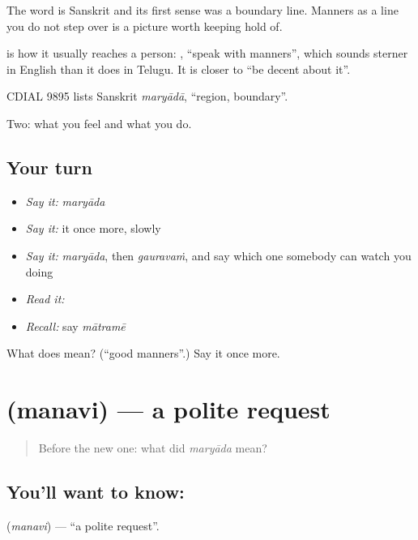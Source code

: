 The word is Sanskrit and its first sense was a boundary line. Manners as a line you do not step over is a picture worth keeping hold of.

 is how it usually reaches a person:  , \textquotedblleft{}speak with manners\textquotedblright{}, which sounds sterner in English than it does in Telugu. It is closer to \textquotedblleft{}be decent about it\textquotedblright{}.

CDIAL 9895 lists Sanskrit \emph{maryādā}, \textquotedblleft{}region, boundary\textquotedblright{}.

\begin{grammarlens}[title={What you've built}]
Two: what you feel and what you do.
\end{grammarlens}

\subsection*{Your turn}
\begin{itemize}
\raggedright
  \item \emph{Say it:} \emph{maryāda}
  \item \emph{Say it:} it once more, slowly
  \item \emph{Say it:} \emph{maryāda}, then \emph{gauravaṁ}, and say which one somebody can watch you doing
  \item \emph{Read it:} \textbf{}
  \item \emph{Recall:} say \emph{mātramē}
\end{itemize}

\begin{tcolorbox}[breakable,colback=teal!4,colframe=teal!35!black,title={Before you move on}]
What does  mean? (\textquotedblleft{}good manners\textquotedblright{}.) Say it once more.
\end{tcolorbox}
\section[\texorpdfstring{\te{మనవి} (manavi)}{మనవి (manavi)}]{ (manavi) — a polite request}

\label{lesson:TE-C65-request}



\begin{quote}
Before the new one: what did \emph{maryāda} mean?
\end{quote}

\subsection*{You'll want to know: }
\textbf{} (\emph{manavi}) — \textquotedblleft{}a polite request\textquotedblright{}.


